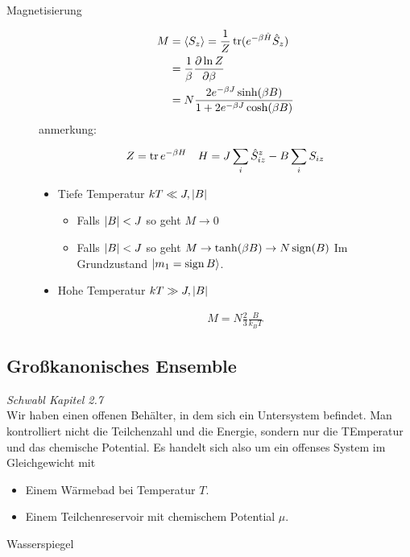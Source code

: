 \begin{description}
  \item[Magnetisierung] 
    \begin{align*}
      M & = \Braket{S_z} = \frac{1}{Z} \operatorname{tr} (e^{-\beta \hat{H}} \hat{S}_z) \\
        & = \frac{1}{\beta} \frac{\partial \ln{ Z} }{\partial \beta} \\
        & = N \frac{2 e^{-\beta J} \sinh(\beta B)}{1 + 2 e^{-\beta J} \cosh
    (\beta B)}
    \end{align*}
    anmerkung:
    \begin{align*}
      Z = \operatorname{tr} e^{-\beta H} && H = J \sum_{i}^{} \hat{S}_{iz}^z - B \sum_{i}^{}
      S_{iz}
    \end{align*}
    \begin{itemize}
      \item Tiefe Temperatur $k T \ll J, \left| B \right|$
        \begin{itemize}
          \item Falls $\left| B \right| < J$ so geht $M \to 0$ \\
          \item Falls $\left| B \right| < J$ so geht $M \to \tanh(\beta B) \to N \operatorname{sign}(B)$
            Im Grundzustand $ \Ket{m_1 = \operatorname{sign} B}$.
        \end{itemize}
    \item Hohe Temperatur $k T \gg J, \left| B \right|$ \\
        \begin{theorem*}
            \begin{align*}
                M = N \frac{2}{3} \frac{B}{k_B T}
            \end{align*}
        \end{theorem*}

        
    \end{itemize}
\end{description}
\subsection*{Gro\ss{}kanonisches Ensemble}
\emph{Schwabl Kapitel 2.7} \\
Wir haben einen offenen Beh\"alter, in dem sich ein Untersystem befindet.
Man kontrolliert nicht die Teilchenzahl und die Energie, sondern nur die TEmperatur
und das chemische Potential.
Es handelt sich also um ein offenses System im Gleichgewicht mit
\begin{itemize}
  \item Einem W\"armebad bei Temperatur $T$.
  \item Einem Teilchenreservoir mit chemischem Potential $\mu$.
\end{itemize}
\begin{beispiel} Wasserspiegel
    
\end{beispiel}

